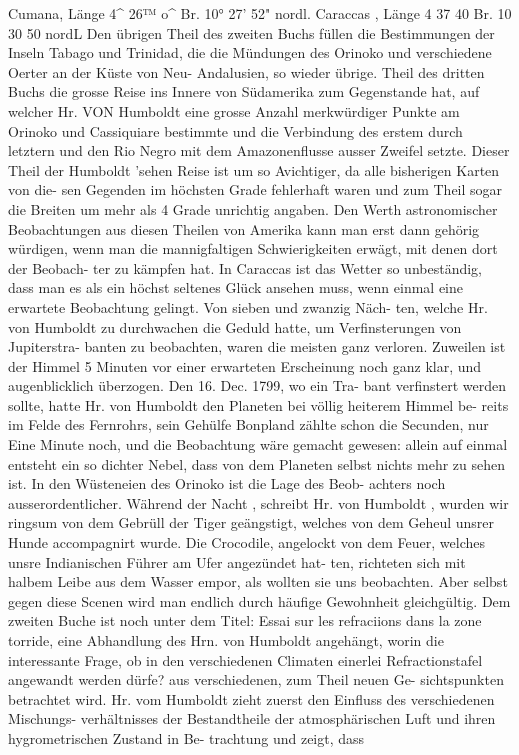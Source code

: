 \documentclass[12pt,a4paper]{article}
\begin{document}
Cumana,  Länge     4\textasciicircum{}  26™    o\textasciicircum{}    Br.  10°  27'    52"  nordl. Caraccas ,  Länge     4     37     40     Br.  10     30     50     nordL Den  übrigen  Theil  des  zweiten  Buchs  füllen  die  Bestimmungen  der  Inseln  Tabago  und  Trinidad,  die die  Mündungen  des  Orinoko  und  verschiedene  Oerter  an  der  Küste  von  Neu- Andalusien,  so  wieder  übrige. Theil  des  dritten  Buchs  die  grosse  Reise  ins  Innere  von  Südamerika  zum  Gegenstande  hat,  auf  welcher Hr.  VON  Humboldt  eine  grosse  Anzahl  merkwürdiger  Punkte  am  Orinoko  und  Cassiquiare  bestimmte  und die  Verbindung  des  erstem  durch  letztern  und  den  Rio  Negro  mit  dem  Amazonenflusse  ausser  Zweifel setzte.  Dieser  Theil  der  Humboldt 'sehen  Reise  ist  um  so  Avichtiger,  da  alle  bisherigen  Karten  von  die- sen Gegenden  im  höchsten  Grade  fehlerhaft  waren  und  zum  Theil  sogar  die  Breiten  um  mehr  als  4 Grade  unrichtig  angaben. Den  Werth  astronomischer  Beobachtungen  aus  diesen  Theilen  von  Amerika  kann  man  erst  dann gehörig  würdigen,  wenn  man  die  mannigfaltigen  Schwierigkeiten  erwägt,  mit  denen  dort  der  Beobach- ter zu  kämpfen  hat.  In  Caraccas  ist  das  Wetter  so  unbeständig,  dass  man  es  als  ein  höchst  seltenes Glück  ansehen  muss,  wenn  einmal  eine  erwartete  Beobachtung  gelingt.  Von  sieben  und  zwanzig  Näch- ten, welche  Hr.  von  Humboldt  zu  durchwachen  die  Geduld  hatte,  um  Verfinsterungen  von  Jupiterstra- banten zu  beobachten,  waren  die  meisten  ganz  verloren.  Zuweilen  ist  der  Himmel  5  Minuten  vor  einer erwarteten  Erscheinung  noch  ganz  klar,  und  augenblicklich  überzogen.  Den  16.  Dec.  1799,  wo  ein  Tra- bant verfinstert  werden  sollte,  hatte  Hr.  von  Humboldt  den  Planeten  bei  völlig  heiterem  Himmel  be- reits im  Felde  des  Fernrohrs,  sein  Gehülfe  Bonpland  zählte  schon  die  Secunden,  nur  Eine  Minute  noch, und  die  Beobachtung  wäre  gemacht  gewesen:  allein  auf  einmal  entsteht  ein  so  dichter  Nebel,  dass  von dem  Planeten  selbst  nichts  mehr  zu  sehen  ist.  In  den  Wüsteneien  des  Orinoko  ist  die  Lage  des  Beob- achters noch  ausserordentlicher.  Während  der  Nacht ,  schreibt  Hr.  von  Humboldt  ,  wurden  wir  ringsum von  dem  Gebrüll  der  Tiger  geängstigt,  welches  von  dem  Geheul  unsrer  Hunde  accompagnirt  wurde. Die  Crocodile,  angelockt  von  dem  Feuer,  welches  unsre  Indianischen  Führer  am  Ufer  angezündet  hat- ten, richteten  sich  mit  halbem  Leibe  aus  dem  Wasser  empor,  als  wollten  sie  uns  beobachten.  Aber selbst  gegen  diese  Scenen  wird  man  endlich  durch  häufige  Gewohnheit  gleichgültig. Dem  zweiten  Buche  ist  noch  unter  dem  Titel:  Essai  sur  les  refraciions  dans  la  zone  torride,  eine Abhandlung  des  Hrn.  von  Humboldt  angehängt,  worin  die  interessante  Frage,  ob  in  den  verschiedenen Climaten  einerlei  Refractionstafel  angewandt  werden  dürfe?  aus  verschiedenen,  zum  Theil  neuen  Ge- sichtspunkten betrachtet  wird.  Hr.  vom  Humboldt  zieht  zuerst  den  Einfluss  des  verschiedenen  Mischungs- verhältnisses der  Bestandtheile  der  atmosphärischen  Luft  und  ihren  hygrometrischen  Zustand  in  Be- trachtung und  zeigt,  dass 
\end{document}
